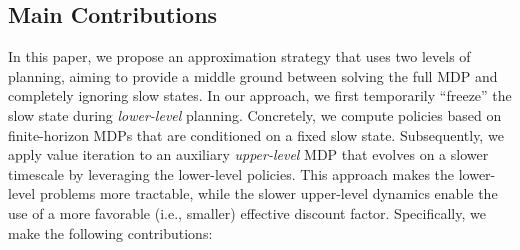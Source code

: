 \documentclass[11pt, notitlepage]{article}
\newcommand{\1}{\mathbbm{1}}
\begin{document}
\subsection{Main Contributions}
In this paper, we propose an approximation strategy that uses two levels of planning, aiming to provide a middle ground between solving the full MDP and completely ignoring slow states. In our approach, we first temporarily ``freeze'' the slow state during \emph{lower-level} planning. Concretely, we compute policies based on finite-horizon MDPs that are conditioned on a fixed slow state. Subsequently, we apply value iteration to an auxiliary \emph{upper-level} MDP that evolves on a slower timescale by leveraging the lower-level policies. This approach makes the lower-level problems more tractable, while the slower upper-level dynamics enable the use of a more favorable (i.e., smaller) effective discount factor.  
Specifically, we make the following contributions:
\end{document}
